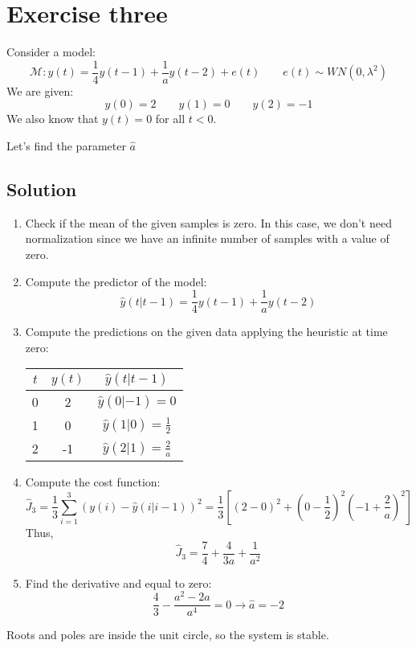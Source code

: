 \section{Exercise three}

Consider a model: 
\[\mathcal{M}:y(t)=\dfrac{1}{4}y(t-1)+\dfrac{1}{a}y(t-2)+e(t)\qquad e(t)\sim WN(0,\lambda^2)\]
We are given:
\[y(0)=2 \qquad y(1)=0 \qquad y(2)=-1\]
We also know that $y(t)=0$ for all $t < 0$. 

Let's find the parameter $\hat{a}$

\subsection*{Solution}
\begin{enumerate}
    \item Check if the mean of the given samples is zero.
        In this case, we don't need normalization since we have an infinite number of samples with a value of zero.
    \item Compute the predictor of the model:
        \[\hat{y}(t|t-1)=\dfrac{1}{4}y(t-1)+\dfrac{1}{a}y(t-2)\]
    \item Compute the predictions on the given data applying the heuristic at time zero:
        \begin{table}[H]
            \centering
            \begin{tabular}{ccc}
            \hline
            $t$ & $y(t)$ & $\hat{y}(t|t-1)$                 \\ \hline
            0   & 2      & $\hat{y}(0|-1)=0$                \\
            1   & 0      & $\hat{y}(1|0)=\frac{1}{2}$       \\
            2   & -1      & $\hat{y}(2|1)=\frac{2}{a}$      \\ \hline
            \end{tabular}
        \end{table}
    \item Compute the cost function:
        \[\hat{J}_3=\dfrac{1}{3}\sum_{i=1}^{3}{\left(y(i)-\hat{y}(i|i-1)\right)}^2=\dfrac{1}{3}\left[{\left(2-0\right)}^2+{\left(0-\dfrac{1}{2}\right)}^2{\left(-1+\dfrac{2}{a}\right)}^2\right]\]
        Thus, 
        \[\hat{J}_3=\dfrac{7}{4}+\dfrac{4}{3a}+\dfrac{1}{a^2}\]
    \item Find the derivative and equal to zero: 
        \[\dfrac{4}{3}-\dfrac{a^2-2a}{a^4}=0\rightarrow \hat{a}=-2\]
\end{enumerate}
Roots and poles are inside the unit circle, so the system is stable.
